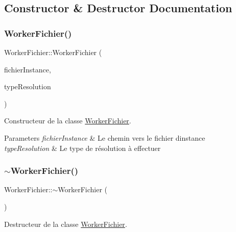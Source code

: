 \subsection{Constructor \& Destructor Documentation}
\mbox{\label{classWorkerFichier_a9ec0e174cceef123487826fb902fb649}} 
\subsubsection{\texorpdfstring{Worker\+Fichier()}{WorkerFichier()}}
{\footnotesize\ttfamily Worker\+Fichier\+::\+Worker\+Fichier (\begin{DoxyParamCaption}\item[{Q\+String}]{fichier\+Instance,  }\item[{Q\+String}]{type\+Resolution }\end{DoxyParamCaption})}



Constructeur de la classe \hyperlink{classWorkerFichier}{Worker\+Fichier}. 


\begin{DoxyParams}{Parameters}
{\em fichier\+Instance} & Le chemin vers le fichier d\textquotesingle{}instance \\
\hline
{\em type\+Resolution} & Le type de résolution à effectuer \\
\hline
\end{DoxyParams}
\mbox{\label{classWorkerFichier_acabdd12b795f6b7f656e0ed9e61cb6ca}} 
\subsubsection{\texorpdfstring{$\sim$\+Worker\+Fichier()}{~WorkerFichier()}}
{\footnotesize\ttfamily Worker\+Fichier\+::$\sim$\+Worker\+Fichier (\begin{DoxyParamCaption}{ }\end{DoxyParamCaption})}



Destructeur de la classe \hyperlink{classWorkerFichier}{Worker\+Fichier}. 



